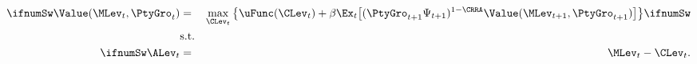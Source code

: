 \begin{eqnarray}
\ifnumSw  \Value(\MLev_{t},\PtyGro_t) & = & \max_{\CLev_{t}} \big\{ \uFunc(\CLev_{t}) + \beta \Ex_{t} \big[ (\PtyGro_{t+1}\Psi_{t+1})^{1-\CRRA} \Value(\MLev_{t+1},\PtyGro_{t+1}) \big] \big\} \label{eq:RAscaledV} \ifnumSw
\\  & \mbox{s.t.} & \nonumber
\\ \ifnumSw \ALev_{t} & = & \MLev_{t}-\CLev_{t}. \nonumber
\end{eqnarray}
